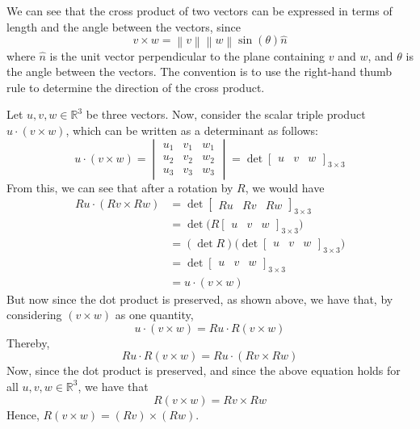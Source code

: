 We can see that the cross product of two vectors can be expressed in terms of length and the angle between the vectors, since
\[
    v \times w = \left \| v \right \| \left \| w \right \| \sin(\theta) \hat{n}
\]
where \( \hat{n} \) is the unit vector perpendicular to the plane containing \( v \) and \( w \), and \( \theta \) is the angle between the vectors.
The convention is to use the right-hand thumb rule to determine the direction of the cross product.

Let \( u, v, w \in \mathbb{R}^{3} \) be three vectors.
Now, consider the scalar triple product \( u \cdot (v \times w) \), which can be written as a determinant as follows:
\[
    u \cdot (v \times w)
    =
    \begin{vmatrix}
        u_{1} & v_{1} & w_{1} \\
        u_{2} & v_{2} & w_{2} \\
        u_{3} & v_{3} & w_{3}
    \end{vmatrix}
    =
    \det
    \begin{bmatrix}
        u & v & w
    \end{bmatrix}_{3 \times 3}
\]
From this, we can see that after a rotation by \( R \), we would have
\begin{align*}
    R u \cdot (R v \times R w)
     & =
    \det
    \begin{bmatrix}
        R u & R v & R w
    \end{bmatrix}_{3 \times 3}
    \\ & =
    \det \Big(
    R \begin{bmatrix}
          u & v & w
      \end{bmatrix}_{3 \times 3}
    \Big)
    \\ & =
    (\det R)
    \Big( \det
    \begin{bmatrix}
        u & v & w
    \end{bmatrix}_{3 \times 3} \Big)
    \\ & =
    \det
    \begin{bmatrix}
        u & v & w
    \end{bmatrix}_{3 \times 3}
    \\ & =
    u \cdot (v \times w)
\end{align*}
But now since the dot product is preserved, as shown above, we have that, by considering \( (v \times w) \) as one quantity,
\[
    u \cdot (v \times w)
    =
    R u \cdot R (v \times w)
\]
Thereby,
\[
    R u \cdot R (v \times w)
    =
    R u \cdot (R v \times R w)
\]
Now, since the dot product is preserved, and since the above equation holds for all \( u, v, w \in \mathbb{R}^{3} \), we have that
\[
    R (v \times w)
    =
    R v \times R w
\]
Hence, \( \boxed{ R(v \times w) =(R v) \times(R w) } \).

